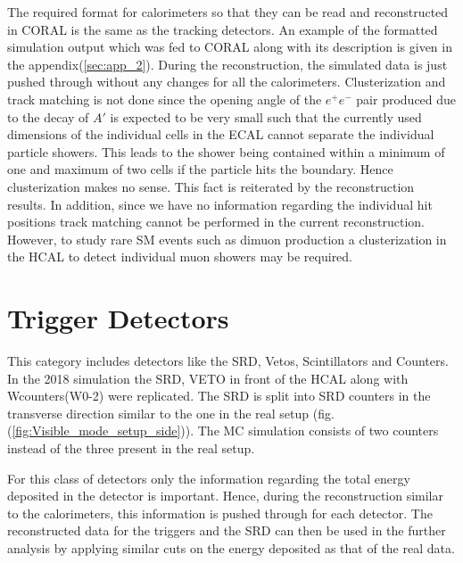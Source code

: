  The required format for calorimeters so that they can be read and reconstructed in CORAL is the same as the tracking detectors. An example of the formatted simulation output which was fed to CORAL along with its description is given in the appendix(\ref{sec:app_2}). During the reconstruction, the simulated data is just pushed through without any changes for all the calorimeters. Clusterization and track matching is not done since the opening angle of the $e^+e^-$ pair produced due to the decay of $A'$ is expected to be very small such that the currently used dimensions of the individual cells in the ECAL cannot separate the individual particle showers. This leads to the shower being contained within a minimum of one and maximum of two cells if the particle hits the boundary. Hence clusterization makes no sense. This fact is reiterated by the reconstruction results. In addition, since we have no information regarding the individual hit positions track matching cannot be performed in the current reconstruction. However, to study rare SM events such as dimuon production a clusterization in the HCAL to detect individual muon showers may be required.



 \section{Trigger Detectors}
 This category includes detectors like the SRD, Vetos, Scintillators and Counters. In the 2018 simulation the SRD, VETO in front of the HCAL along with Wcounters(W0-2) were replicated. The SRD is split into SRD counters in the transverse direction similar to the one in the real setup (fig.(\ref{fig:Visible_mode_setup_side})). The MC simulation consists of two counters instead of the three present in the real setup.

 For this class of detectors only the information regarding the total energy deposited in the detector is important. Hence, during the reconstruction similar to the calorimeters, this information is pushed through for each detector. The reconstructed data for the triggers and the SRD can then be used in the further analysis by applying similar cuts on the energy deposited as that of the real data.
\newpage
